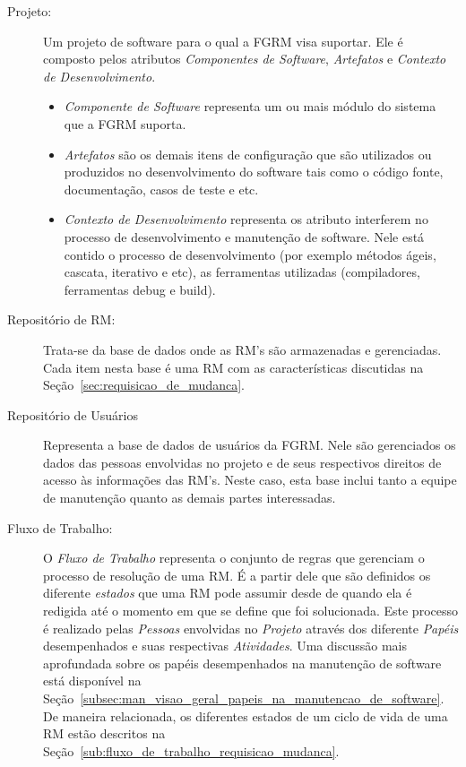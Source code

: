 \begin{description}
	\item[Projeto:] Um projeto de software para o qual a FGRM visa suportar.
		Ele é composto pelos atributos \textit{Componentes de Software},
		\textit{Artefatos} e \textit{Contexto de Desenvolvimento}.
		\begin{itemize}
			\item  \textit{Componente de Software} representa um ou mais módulo
				do sistema que a FGRM suporta.
			\item \textit{Artefatos} são os demais itens de configuração que são
				utilizados ou produzidos no desenvolvimento do software tais
				como o código fonte, documentação, casos de teste e etc.
			\item \textit{Contexto de Desenvolvimento} representa os atributo
				interferem no processo de desenvolvimento e manutenção de
				software. Nele está contido o processo de desenvolvimento (por
				exemplo métodos ágeis, cascata, iterativo e etc), as ferramentas
				utilizadas (compiladores, ferramentas debug e build).
		\end{itemize}
	\item[Repositório de RM:] Trata-se da base de dados onde as RM's são
		armazenadas e gerenciadas. Cada item nesta base é uma RM com as
		características discutidas na Seção~\ref{sec:requisicao_de_mudanca}.
	\item[Repositório de Usuários] Representa a base de dados de usuários da
		FGRM. Nele são gerenciados os dados das pessoas envolvidas no projeto e
		de seus respectivos direitos de acesso às informações das RM's. Neste
		caso, esta base inclui tanto a equipe de manutenção quanto as demais
		partes interessadas.
	\item[Fluxo de Trabalho:] O \textit{Fluxo de Trabalho} representa o conjunto
		de regras que gerenciam o processo de resolução de uma RM. É a partir
		dele que são definidos os diferente \textit{estados} que uma RM pode
		assumir desde de quando ela é redigida até o momento em que se define
		que foi solucionada. Este processo é realizado pelas \textit{Pessoas}
		envolvidas no \textit{Projeto} através dos diferente \textit{Papéis}
		desempenhados e suas respectivas \textit{Atividades}. Uma discussão mais
		aprofundada sobre os papéis desempenhados na manutenção de software está
		disponível na
		Seção~\ref{subsec:man_visao_geral_papeis_na_manutencao_de_software}.  De
		maneira relacionada, os diferentes estados de um ciclo de vida de uma RM
		estão descritos na Seção~\ref{sub:fluxo_de_trabalho_requisicao_mudanca}.
\end{description}


